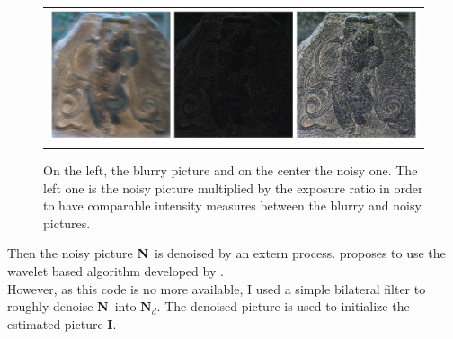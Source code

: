 \documentclass{article}
\newcommand{\I}{\textbf{I}}
\newcommand{\N}{\textbf{N}}
\newcommand{\Nd}{\textbf{N$_d$}}
\begin{document}
\begin{figure}[ht]
\begin{center}
	\begin{tabular}{c}	
		\includegraphics[scale=0.5]{images/enhanced.jpg}
	\end{tabular}
	\caption{On the left, the blurry picture and on the center the noisy one. The left one is the noisy picture multiplied by the exposure ratio in order to have comparable intensity measures between the blurry and noisy pictures.}
	\label{enhanced}
\end{center}
\end{figure}

\newpage

Then the noisy picture \N\ is denoised by an extern process. \cite{deblur_denoise} proposes to use the wavelet based algorithm developed by \cite{rough_denoise}.\\
However, as this code is no more available, I used a simple bilateral filter to roughly denoise \N\ into $\Nd$. The denoised picture is used to initialize the estimated picture \I.
\end{document}
